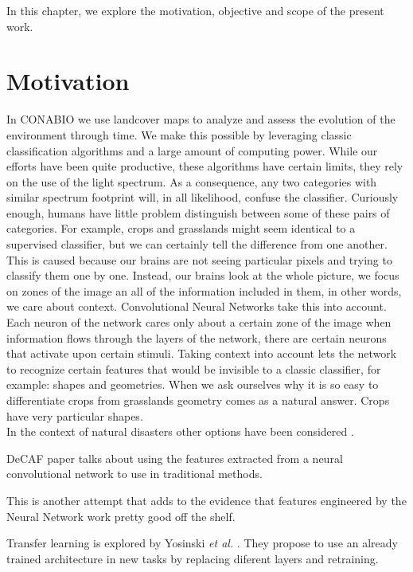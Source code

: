 In this chapter, we explore the motivation, objective and scope of the present work.\\


\section{Motivation}

In CONABIO we use landcover maps to analyze and assess the evolution of the environment through time. We make this possible by leveraging classic classification algorithms and a large amount of computing power. While our efforts have been quite productive, these algorithms have certain limits, they rely on the use of the light spectrum. As a consequence, any two categories with similar spectrum footprint will, in all likelihood, confuse the classifier. Curiously enough, humans have little problem distinguish between some of these pairs of categories. For example, crops and grasslands might seem identical to a supervised classifier, but we can certainly tell the difference from one another. This is caused because our brains are not seeing particular pixels and trying to classify them one by one. Instead, our brains look at the whole picture, we focus on zones of the image an all of the information included in them, in other words, we care about context. Convolutional Neural Networks take this into account. Each neuron of the network cares only about a certain zone of the image when information flows through the layers of the network, there are certain neurons that activate upon certain stimuli. Taking context into account lets the network to recognize certain features that would be invisible to a classic classifier, for example: shapes and geometries. When we ask ourselves why it is so easy to differentiate crops from grasslands geometry comes as a natural answer. Crops have very particular shapes.\\

In the context of natural disasters other options have been considered \cite{Kryvasheyeue1500779}.

DeCAF paper talks about using the features extracted from a neural convolutional network to use in traditional methods. \cite{DBLP:journals/corr/DonahueJVHZTD13}

This is another attempt that adds to the evidence that features engineered by the Neural Network work pretty good off the shelf. \cite{DBLP:journals/corr/RazavianASC14}

Transfer learning is explored by Yosinski \textit{et al.} \cite{DBLP:journals/corr/YosinskiCBL14}. They propose to use an already trained architecture in new tasks by replacing diferent layers and retraining.

